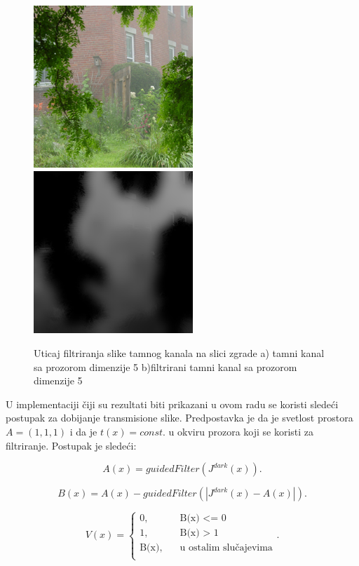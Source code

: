 \documentclass[a4paper,12pt,titlepage]{article}
\begin{document}
\begin{figure}[ht!]
\centering
\includegraphics[width=60mm]{img/haze.png}
\includegraphics[width=60mm]{img/hazeDC5F.png}
\caption{Uticaj filtriranja slike tamnog kanala na slici zgrade a) tamni kanal sa prozorom dimenzije 5 b)filtrirani tamni kanal sa prozorom dimenzije 5}
\label{FiltriraniTamniKanal}
\end{figure}   

U implementaciji čiji su rezultati biti prikazani u ovom radu se koristi sledeći postupak za dobijanje transmisione slike. Predpostavka je da je svetlost prostora $A = (1, 1, 1)$ i da je $t(x) = const.$ u okviru prozora koji se koristi za filtriranje. Postupak je sledeći:

\begin{equation}\label{eq:haze4}
A(x) = guidedFilter(J^{dark}(x)).
\end{equation}

\begin{equation}\label{eq:haze5}
B(x) = A(x) - guidedFilter(|J^{dark}(x) - A(x)|).
\end{equation}

\begin{equation}\label{eq:haze6}
V(x) = 
     \begin{cases}
       \text{0,} &\quad\text{B(x) <= 0}\\
       \text{1,} &\quad\text{B(x) > 1} \\
       \text{B(x),} &\quad\text{u ostalim slučajevima}\\
     \end{cases}
. \end{equation}
\end{document}
